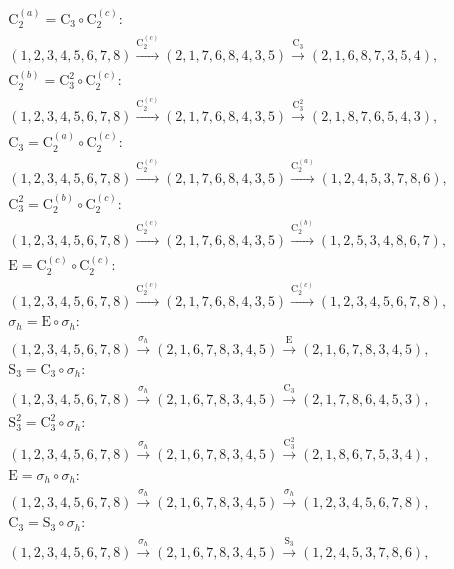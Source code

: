 \begin{align*}
& \mathrm{C}_{2}^{(a)} = \mathrm{C}_{3} \circ \mathrm{C}_{2}^{(c)}:\; \\& (1,2,3,4,5,6,7,8) \xrightarrow{\mathrm{C}_{2}^{(c)}} (2,1,7,6,8,4,3,5) \xrightarrow{\mathrm{C}_{3}} (2,1,6,8,7,3,5,4), \\
& \mathrm{C}_{2}^{(b)} = \mathrm{C}_{3}^{2} \circ \mathrm{C}_{2}^{(c)}:\; \\& (1,2,3,4,5,6,7,8) \xrightarrow{\mathrm{C}_{2}^{(c)}} (2,1,7,6,8,4,3,5) \xrightarrow{\mathrm{C}_{3}^{2}} (2,1,8,7,6,5,4,3), \\
& \mathrm{C}_{3} = \mathrm{C}_{2}^{(a)} \circ \mathrm{C}_{2}^{(c)}:\; \\& (1,2,3,4,5,6,7,8) \xrightarrow{\mathrm{C}_{2}^{(c)}} (2,1,7,6,8,4,3,5) \xrightarrow{\mathrm{C}_{2}^{(a)}} (1,2,4,5,3,7,8,6), \\
& \mathrm{C}_{3}^{2} = \mathrm{C}_{2}^{(b)} \circ \mathrm{C}_{2}^{(c)}:\; \\& (1,2,3,4,5,6,7,8) \xrightarrow{\mathrm{C}_{2}^{(c)}} (2,1,7,6,8,4,3,5) \xrightarrow{\mathrm{C}_{2}^{(b)}} (1,2,5,3,4,8,6,7), \\
& \mathrm{E} = \mathrm{C}_{2}^{(c)} \circ \mathrm{C}_{2}^{(c)}:\; \\& (1,2,3,4,5,6,7,8) \xrightarrow{\mathrm{C}_{2}^{(c)}} (2,1,7,6,8,4,3,5) \xrightarrow{\mathrm{C}_{2}^{(c)}} (1,2,3,4,5,6,7,8), \\
& \sigma_{h} = \mathrm{E} \circ \sigma_{h}:\; \\& (1,2,3,4,5,6,7,8) \xrightarrow{\sigma_{h}} (2,1,6,7,8,3,4,5) \xrightarrow{\mathrm{E}} (2,1,6,7,8,3,4,5), \\
& \mathrm{S}_{3} = \mathrm{C}_{3} \circ \sigma_{h}:\; \\& (1,2,3,4,5,6,7,8) \xrightarrow{\sigma_{h}} (2,1,6,7,8,3,4,5) \xrightarrow{\mathrm{C}_{3}} (2,1,7,8,6,4,5,3), \\
& \mathrm{S}_{3}^{2} = \mathrm{C}_{3}^{2} \circ \sigma_{h}:\; \\& (1,2,3,4,5,6,7,8) \xrightarrow{\sigma_{h}} (2,1,6,7,8,3,4,5) \xrightarrow{\mathrm{C}_{3}^{2}} (2,1,8,6,7,5,3,4), \\
& \mathrm{E} = \sigma_{h} \circ \sigma_{h}:\; \\& (1,2,3,4,5,6,7,8) \xrightarrow{\sigma_{h}} (2,1,6,7,8,3,4,5) \xrightarrow{\sigma_{h}} (1,2,3,4,5,6,7,8), \\
& \mathrm{C}_{3} = \mathrm{S}_{3} \circ \sigma_{h}:\; \\& (1,2,3,4,5,6,7,8) \xrightarrow{\sigma_{h}} (2,1,6,7,8,3,4,5) \xrightarrow{\mathrm{S}_{3}} (1,2,4,5,3,7,8,6), \\

\end{align*}
